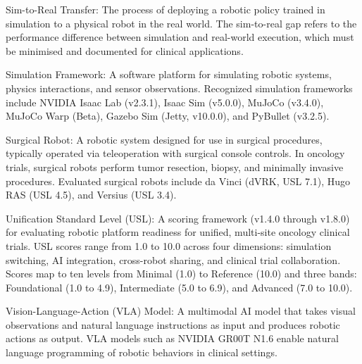 \documentclass[11pt]{article}
\begin{document}
Sim-to-Real Transfer: The process of deploying a robotic policy trained in simulation to a physical robot in the real world. The sim-to-real gap refers to the performance difference between simulation and real-world execution, which must be minimised and documented for clinical applications.

Simulation Framework: A software platform for simulating robotic systems, physics interactions, and sensor observations. Recognized simulation frameworks include NVIDIA Isaac Lab (v2.3.1), Isaac Sim (v5.0.0), MuJoCo (v3.4.0), MuJoCo Warp (Beta), Gazebo Sim (Jetty, v10.0.0), and PyBullet (v3.2.5).

Surgical Robot: A robotic system designed for use in surgical procedures, typically operated via teleoperation with surgical console controls. In oncology trials, surgical robots perform tumor resection, biopsy, and minimally invasive procedures. Evaluated surgical robots include da Vinci (dVRK, USL 7.1), Hugo RAS (USL 4.5), and Versius (USL 3.4).

Unification Standard Level (USL): A scoring framework (v1.4.0 through v1.8.0) for evaluating robotic platform readiness for unified, multi-site oncology clinical trials. USL scores range from 1.0 to 10.0 across four dimensions: simulation switching, AI integration, cross-robot sharing, and clinical trial collaboration. Scores map to ten levels from Minimal (1.0) to Reference (10.0) and three bands: Foundational (1.0 to 4.9), Intermediate (5.0 to 6.9), and Advanced (7.0 to 10.0).

Vision-Language-Action (VLA) Model: A multimodal AI model that takes visual observations and natural language instructions as input and produces robotic actions as output. VLA models such as NVIDIA GR00T N1.6 enable natural language programming of robotic behaviors in clinical settings.

\clearpage
\nocite{ich-e6-r3}
\printbibliography[title={Bibliography}]
\end{document}
